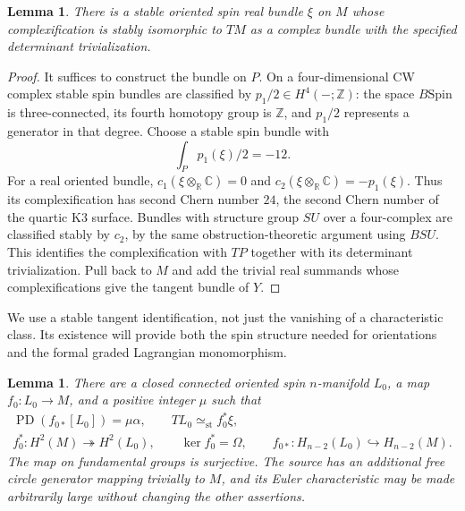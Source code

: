 \documentclass[11pt]{article}
\numberwithin{equation}{section}
\newtheorem{lemma}[theorem]{Lemma}
\theoremstyle{definition}
\theoremstyle{remark}
\newcommand{\C}{\mathbb C}
\newcommand{\R}{\mathbb R}
\newcommand{\Z}{\mathbb Z}
\newcommand{\PD}{\operatorname{PD}}
\begin{document}
\begin{lemma}\label{top:lem:real-form}
There is a stable oriented spin real bundle $\xi$ on $M$ whose
complexification is stably isomorphic to $TM$ as a complex bundle with
the specified determinant trivialization.
\end{lemma}

\begin{proof}
It suffices to construct the bundle on $P$.  On a four-dimensional CW
complex stable spin bundles are classified by $p_1/2\in H^4(-;\Z)$:
the space $B\mathrm{Spin}$ is three-connected, its fourth homotopy
group is $\Z$, and $p_1/2$ represents a generator in that degree.
Choose a stable spin bundle with
\[
        \int_Pp_1(\xi)/2=-12.
\]
For a real oriented bundle, $c_1(\xi\otimes_\R\C)=0$ and
$c_2(\xi\otimes_\R\C)=-p_1(\xi)$.  Thus its complexification has
second Chern number $24$, the second Chern number of the quartic K3
surface.  Bundles with structure group $SU$ over a four-complex are
classified stably by $c_2$, by the same obstruction-theoretic argument
using $BSU$.  This identifies the complexification with $TP$ together
with its determinant trivialization.  Pull back to $M$ and add the
trivial real summands whose complexifications give the tangent bundle
of $Y$.
\end{proof}

We use a stable tangent identification, not just the vanishing of a
characteristic class.  Its existence will provide both the spin structure
needed for orientations and the formal graded Lagrangian monomorphism.

\begin{lemma}\label{top:lem:source}
There are a closed connected oriented spin $n$-manifold $L_0$, a map
$f_0:L_0\to M$, and a positive integer $\mu$ such that
\begin{equation}\label{top:eq:source-properties}
 \begin{gathered}
 \PD(f_{0*}[L_0])=\mu\alpha,\qquad
 TL_0\simeq_{\mathrm{st}} f_0^*\xi,\\
 f_0^*:H^2(M)\twoheadrightarrow H^2(L_0),\qquad
 \ker f_0^*=\Omega,\qquad
 f_{0*}:H_{n-2}(L_0)\hookrightarrow H_{n-2}(M).
 \end{gathered}
\end{equation}
The map on fundamental groups is surjective.  The source has an
additional free circle generator mapping trivially to $M$, and its Euler
characteristic may be made arbitrarily large without changing the other
assertions.
\end{lemma}
\end{document}
